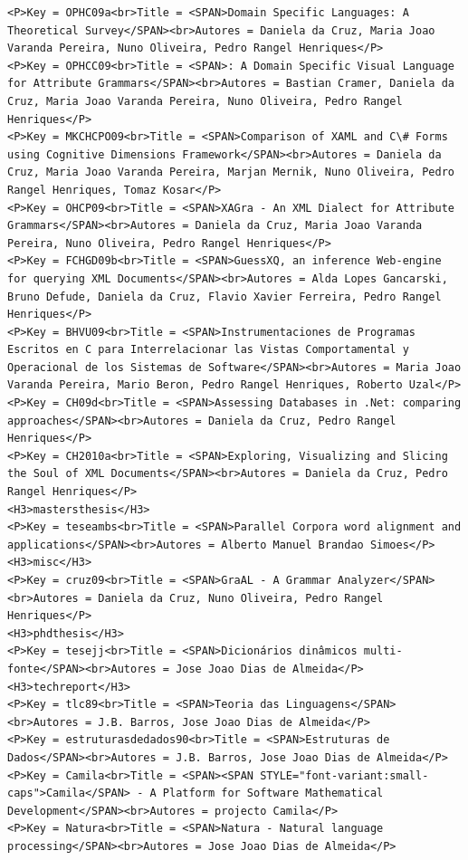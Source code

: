 \documentclass[11pt,a4paper]{report}
\begin{document}
\begin{appendices}
\begin{lstlisting}
<P>Key = OPHC09a<br>Title = <SPAN>Domain Specific Languages: A Theoretical Survey</SPAN><br>Autores = Daniela da Cruz, Maria Joao Varanda Pereira, Nuno Oliveira, Pedro Rangel Henriques</P>
<P>Key = OPHCC09<br>Title = <SPAN>: A Domain Specific Visual Language for Attribute Grammars</SPAN><br>Autores = Bastian Cramer, Daniela da Cruz, Maria Joao Varanda Pereira, Nuno Oliveira, Pedro Rangel Henriques</P>
<P>Key = MKCHCPO09<br>Title = <SPAN>Comparison of XAML and C\# Forms using Cognitive Dimensions Framework</SPAN><br>Autores = Daniela da Cruz, Maria Joao Varanda Pereira, Marjan Mernik, Nuno Oliveira, Pedro Rangel Henriques, Tomaz Kosar</P>
<P>Key = OHCP09<br>Title = <SPAN>XAGra - An XML Dialect for Attribute Grammars</SPAN><br>Autores = Daniela da Cruz, Maria Joao Varanda Pereira, Nuno Oliveira, Pedro Rangel Henriques</P>
<P>Key = FCHGD09b<br>Title = <SPAN>GuessXQ, an inference Web-engine for querying XML Documents</SPAN><br>Autores = Alda Lopes Gancarski, Bruno Defude, Daniela da Cruz, Flavio Xavier Ferreira, Pedro Rangel Henriques</P>
<P>Key = BHVU09<br>Title = <SPAN>Instrumentaciones de Programas Escritos en C para Interrelacionar las Vistas Comportamental y Operacional de los Sistemas de Software</SPAN><br>Autores = Maria Joao Varanda Pereira, Mario Beron, Pedro Rangel Henriques, Roberto Uzal</P>
<P>Key = CH09d<br>Title = <SPAN>Assessing Databases in .Net: comparing approaches</SPAN><br>Autores = Daniela da Cruz, Pedro Rangel Henriques</P>
<P>Key = CH2010a<br>Title = <SPAN>Exploring, Visualizing and Slicing the Soul of XML Documents</SPAN><br>Autores = Daniela da Cruz, Pedro Rangel Henriques</P>
<H3>mastersthesis</H3>
<P>Key = teseambs<br>Title = <SPAN>Parallel Corpora word alignment and applications</SPAN><br>Autores = Alberto Manuel Brandao Simoes</P>
<H3>misc</H3>
<P>Key = cruz09<br>Title = <SPAN>GraAL - A Grammar Analyzer</SPAN><br>Autores = Daniela da Cruz, Nuno Oliveira, Pedro Rangel Henriques</P>
<H3>phdthesis</H3>
<P>Key = tesejj<br>Title = <SPAN>Dicionários dinâmicos multi-fonte</SPAN><br>Autores = Jose Joao Dias de Almeida</P>
<H3>techreport</H3>
<P>Key = tlc89<br>Title = <SPAN>Teoria das Linguagens</SPAN><br>Autores = J.B. Barros, Jose Joao Dias de Almeida</P>
<P>Key = estruturasdedados90<br>Title = <SPAN>Estruturas de Dados</SPAN><br>Autores = J.B. Barros, Jose Joao Dias de Almeida</P>
<P>Key = Camila<br>Title = <SPAN><SPAN STYLE="font-variant:small-caps">Camila</SPAN> - A Platform for Software Mathematical Development</SPAN><br>Autores = projecto Camila</P>
<P>Key = Natura<br>Title = <SPAN>Natura - Natural language processing</SPAN><br>Autores = Jose Joao Dias de Almeida</P>

\end{lstlisting}
\end{appendices}
\end{document}
